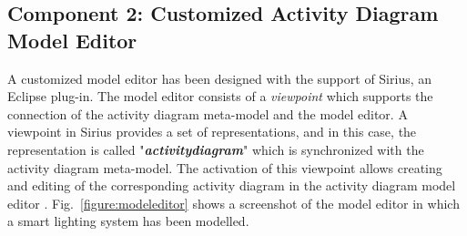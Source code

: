 \subsection{Component 2: Customized Activity Diagram Model Editor}
A customized model editor has been designed with the support of Sirius, an Eclipse plug-in. The model editor consists of a \textit{viewpoint} which supports the connection of the activity diagram meta-model and the model editor. A viewpoint in Sirius provides a set of representations, and in this case, the representation is called "\textbf{\textit{activitydiagram}}" which is synchronized with the activity diagram meta-model. The activation of this viewpoint allows creating and editing of the corresponding activity diagram in the activity diagram model editor \cite{perera2018thesis}. Fig.~\ref{figure:modeleditor} shows a screenshot of the model editor in which a smart lighting system has been modelled.

